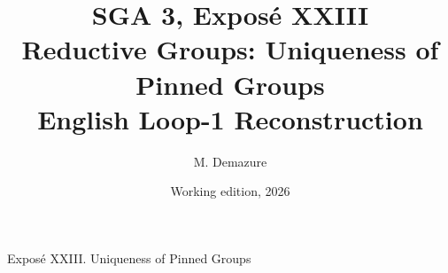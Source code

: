 \documentclass[11pt,a4paper,oneside,leqno]{book}
\title{SGA 3, Exposé XXIII\\Reductive Groups: Uniqueness of Pinned Groups\\
English Loop-1 Reconstruction}
\author{M. Demazure}
\date{Working edition, 2026}
\begin{document}
\frontmatter
\maketitle
\tableofcontents
\mainmatter

         {Exposé XXIII. Uniqueness of Pinned Groups}












\end{document}
